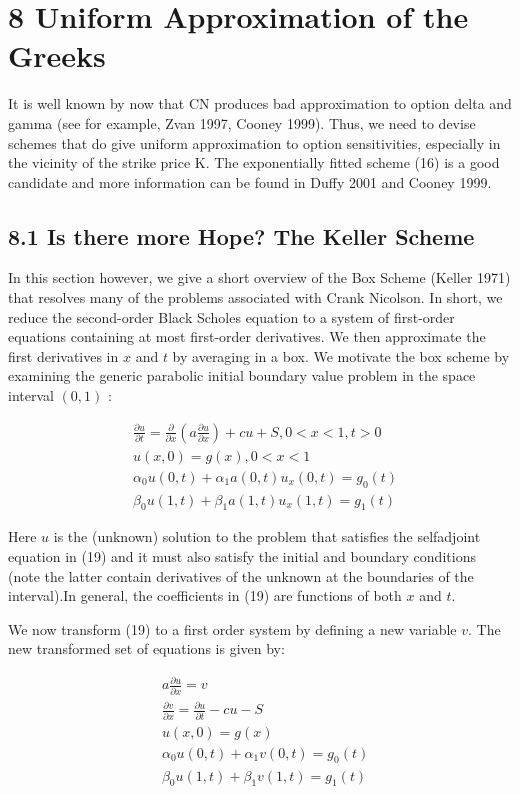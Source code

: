 \documentclass[10pt]{article}
\begin{document}
\section*{8 Uniform Approximation of the Greeks}
It is well known by now that CN produces bad approximation to option delta and gamma (see for example, Zvan 1997, Cooney 1999). Thus, we need to devise schemes that do give uniform approximation to option sensitivities, especially in the vicinity of the strike price K. The exponentially fitted scheme (16) is a good candidate and more information can be found in Duffy 2001 and Cooney 1999.

\subsection*{8.1 Is there more Hope? The Keller Scheme}
In this section however, we give a short overview of the Box Scheme (Keller 1971) that resolves many of the problems associated with Crank Nicolson. In short, we reduce the second-order Black Scholes equation to a system of first-order equations containing at most first-order derivatives. We then approximate the first derivatives in $x$ and $t$ by averaging in a box. We motivate the box scheme by examining the generic parabolic initial boundary value problem in the space interval $(0,1)$ :


\begin{align*}
& \frac{\partial u}{\partial t}=\frac{\partial}{\partial x}\left(a \frac{\partial u}{\partial x}\right)+c u+S, 0<x<1, t>0 \\
& u(x, 0)=g(x), 0<x<1  \tag{19}\\
& \alpha_{0} u(0, t)+\alpha_{1} a(0, t) u_{x}(0, t)=g_{0}(t) \\
& \beta_{0} u(1, t)+\beta_{1} a(1, t) u_{x}(1, t)=g_{1}(t)
\end{align*}


Here $u$ is the (unknown) solution to the problem that satisfies the selfadjoint equation in (19) and it must also satisfy the initial and boundary conditions (note the latter contain derivatives of the unknown at the boundaries of the interval).In general, the coefficients in (19) are functions of both $x$ and $t$.

We now transform (19) to a first order system by defining a new variable $v$. The new transformed set of equations is given by:


\begin{align*}
& a \frac{\partial u}{\partial x}=v \\
& \frac{\partial v}{\partial x}=\frac{\partial u}{\partial t}-c u-S \\
& u(x, 0)=g(x)  \tag{20}\\
& \alpha_{0} u(0, t)+\alpha_{1} v(0, t)=g_{0}(t) \\
& \beta_{0} u(1, t)+\beta_{1} v(1, t)=g_{1}(t)
\end{align*}
\end{document}
